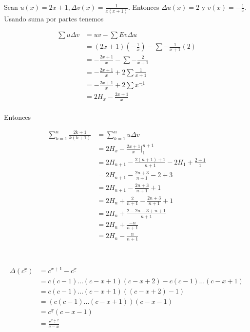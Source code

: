 \documentclass{article}
\begin{document}
\subsection{} %

Sean $u(x) = 2x+1, \Delta v(x) = \frac{1}{x(x+1)}$. Entonces $\Delta u(x) = 2$
y $v(x) = -\frac{1}{x}$. Usando suma por partes tenemos


\begin{align*}
\sum u \Delta v & = uv - \sum Ev \Delta u \\
 & = (2x+1)(-\frac{1}{x}) - \sum -\frac{1}{x+1}(2) \\
 & = -\frac{2x+1}{x} - \sum -\frac{2}{x+1} \\
 & = -\frac{2x+1}{x} + 2\sum \frac{1}{x+1} \\
 & = -\frac{2x+1}{x} + 2\sum x^{\underline{-1}} \\
 & = 2H_x - \frac{2x+1}{x} \\
\end{align*}

Entonces

\begin{align*}
\sum_{k=1}^n \frac{2k+1}{k(k+1)} & = \sum_{k=1}^n u \Delta v \\
             & = 2H_x -\frac{2x+1}{x} \Big |_{1}^{n+1} \\
             & = 2H_{n+1} -\frac{2(n+1)+1}{n+1} - 2H_1 + \frac{2+1}{1} \\
             & = 2H_{n+1} -\frac{2n+3}{n+1} - 2 + 3 \\
             & = 2H_{n+1} -\frac{2n+3}{n+1} + 1 \\
             & = 2H_n + \frac{2}{n+1} -\frac{2n+3}{n+1} + 1 \\
             & = 2H_n + \frac{2-2n-3+n+1}{n+1} \\
             & = 2H_n + \frac{-n}{n+1} \\
             & = 2H_n - \frac{n}{n+1} \\
\end{align*}

\section{} %

\begin{align*}
\Delta(c^{\underline{x}}) & = c^{\underline{x+1}} - c^{\underline{x}} \\
  & = c(c-1) \ldots (c-x+1)(c-x+2) - c(c-1) \ldots (c-x+1) \\
  & = c(c-1) \ldots (c-x+1)((c-x+2)-1) \\
  & = (c(c-1) \ldots (c-x+1))(c-x-1) \\
  & = c^{\underline{x}}(c-x-1) \\
  & = \frac{c^{\underline{x+2}}}{c-x} \\
\end{align*}
\end{document}
